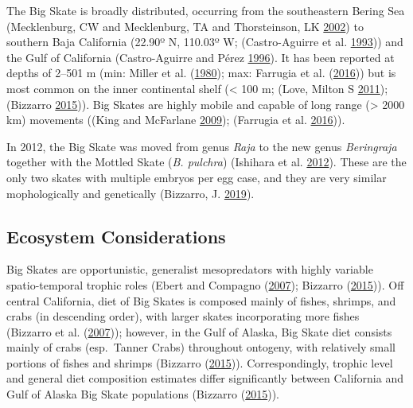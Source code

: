 \documentclass[12pt,]{article}
\begin{document}
The Big Skate is broadly distributed, occurring from the southeastern
Bering Sea (Mecklenburg, CW and Mecklenburg, TA and Thorsteinson, LK
\protect\hyperlink{ref-Mecklenburg2002}{2002}) to southern Baja
California (22.90º N, 110.03º W; (Castro-Aguirre et al.
\protect\hyperlink{ref-Castro1993}{1993})) and the Gulf of California
(Castro-Aguirre and Pérez \protect\hyperlink{ref-Castro1996}{1996}). It
has been reported at depths of 2--501 m (min: Miller et al.
(\protect\hyperlink{ref-Miller1980}{1980}); max: Farrugia et al.
(\protect\hyperlink{ref-Farrugia2016}{2016})) but is most common on the
inner continental shelf (\textless{} 100 m; (Love, Milton S
\protect\hyperlink{ref-Love2011}{2011}); (Bizzarro
\protect\hyperlink{ref-Bizzarro2015}{2015})). Big Skates are highly
mobile and capable of long range (\textgreater{} 2000 km) movements
((King and McFarlane \protect\hyperlink{ref-KingandMcF2009}{2009});
(Farrugia et al. \protect\hyperlink{ref-Farrugia2016}{2016})).

In 2012, the Big Skate was moved from genus \emph{Raja} to the new genus
\emph{Beringraja} together with the Mottled Skate (\emph{B. pulchra})
(Ishihara et al. \protect\hyperlink{ref-Ishihara2012}{2012}). These are
the only two skates with multiple embryos per egg case, and they are
very similar mophologically and genetically (Bizzarro, J.
\protect\hyperlink{ref-Bizzarro2019}{2019}).

\hypertarget{ecosystem-considerations-1}{%
\subsection{Ecosystem Considerations}\label{ecosystem-considerations-1}}

Big Skates are opportunistic, generalist mesopredators with highly
variable spatio-temporal trophic roles (Ebert and Compagno
(\protect\hyperlink{ref-Ebert2007}{2007}); Bizzarro
(\protect\hyperlink{ref-Bizzarro2015}{2015})). Off central California,
diet of Big Skates is composed mainly of fishes, shrimps, and crabs (in
descending order), with larger skates incorporating more fishes
(Bizzarro et al. (\protect\hyperlink{ref-Bizzarro2007}{2007})); however,
in the Gulf of Alaska, Big Skate diet consists mainly of crabs
(esp.~Tanner Crabs) throughout ontogeny, with relatively small portions
of fishes and shrimps (Bizzarro
(\protect\hyperlink{ref-Bizzarro2015}{2015})). Correspondingly, trophic
level and general diet composition estimates differ significantly
between California and Gulf of Alaska Big Skate populations (Bizzarro
(\protect\hyperlink{ref-Bizzarro2015}{2015})).
\end{document}
